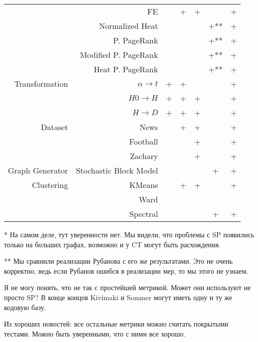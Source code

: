 \documentclass{article}
\begin{document}
\begin{table}[H]
\begin{tabular}{rr|cccc|c}
                & FE                             &            & +        & +      &             & +      \\
                & Normalized Heat                &            &          &        & +**           & \cellcolor{yellow!25}  +      \\
                & P. PageRank          &            &          &        & +**           & \cellcolor{yellow!25}  +      \\
                & Modified P. PageRank &            &          &        & +**           & \cellcolor{yellow!25}  +      \\
                & Heat P. PageRank     &            &          &        & +**           & \cellcolor{yellow!25}  +      \\
                \cline{2-7}
Transformation  & $\alpha \rightarrow t$              & +          & +        &        &             & +      \\
                & $H0 \rightarrow H$             & +          & +        & +      &             & +      \\
                & $H \rightarrow D$              & +          & +        & +      &             & +      \\
                \cline{2-7}
Dataset         & News                           &            & +        & +      &             & +      \\
                & Football                       &            &          & +      &             & +      \\
                & Zachary                        &            &          & +      &             & +      \\
                \cline{2-7}
Graph Generator & Stochastic Block Model &            &          &        & +           & + \\
                \cline{2-7}
Clustering & KMeans & & + & + & & + \\
 & Ward & & & & & \cellcolor{yellow!25} \\
 & Spectral & & & & + & +
\end{tabular}
\end{table}

{
\small
* На самом деле, тут уверенности нет. Мы видели, что проблемы с SP появились только на больших графах, возможно и у CT могут быть расхождения.

** Мы сравнили реализации Рубанова с его же результатами. Это не очень корректно, ведь если Рубанов ошибся в реализации мер, то мы этого не узнаем.
}

\medskip

Я не могу понять, что не так с простейшей метрикой. Может они используют не просто SP? В конце концов Kivimaki и Sommer могут иметь одну и ту же кодовую базу.

Из хороших новостей: все остальные метрики можно считать покрытыми тестами. Можно быть уверенными, что с ними все хорошо.
\end{document}
